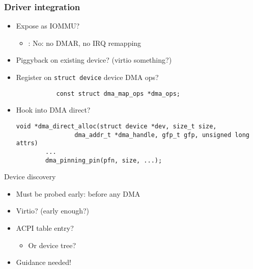 \documentclass{beamer}
\begin{document}
\begin{frame}[fragile]
  \frametitle{Driver integration}
  \begin{itemize}
    \item Expose as IOMMU?
      \begin{itemize}
        \item: No: no DMAR, no IRQ remapping
      \end{itemize}
    \item Piggyback on existing device? (virtio something?)
    \item Register on \texttt{struct device} device DMA ops?
      \begin{verbatim}
           const struct dma_map_ops *dma_ops;
      \end{verbatim}
    \item Hook into DMA direct?
      \begin{verbatim}
void *dma_direct_alloc(struct device *dev, size_t size,
                dma_addr_t *dma_handle, gfp_t gfp, unsigned long attrs)
        ...
        dma_pinning_pin(pfn, size, ...);
      \end{verbatim}
  \end{itemize}
\end{frame}

\begin{frame}{Device discovery}
  \begin{itemize}
    \item Must be probed early: before any DMA
    \item Virtio? (early enough?)
    \item ACPI table entry?
      \begin{itemize}
        \item Or device tree?
      \end{itemize}
    \item Guidance needed!
  \end{itemize}
\end{frame}
\end{document}
